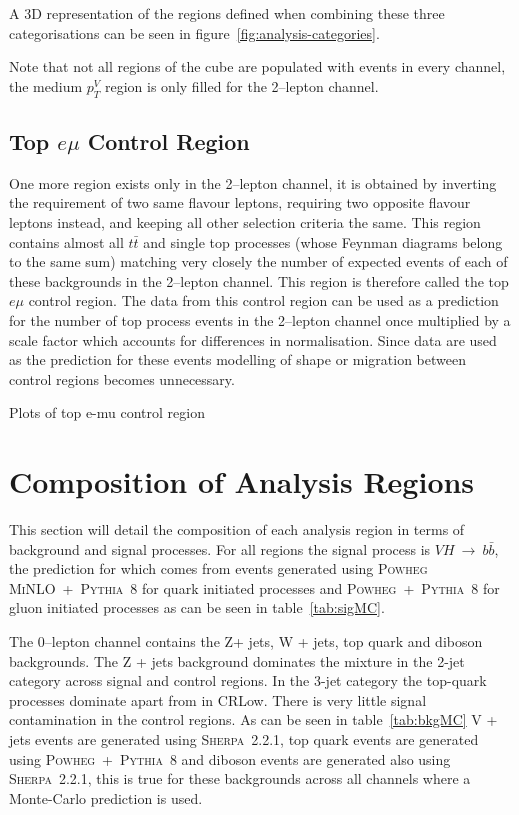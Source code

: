 A 3D representation of the regions defined when combining these three
categorisations can be seen in figure~\ref{fig:analysis-categories}.

Note that not all regions of the cube are populated with events in every channel, the medium
$p_T^V$ region is only filled for the 2--lepton channel.

\subsection{Top \texorpdfstring{$e \mu$}{e mu} Control Region}%
\label{sec:topemucr}

One more region exists only in the 2--lepton channel, it is obtained by
inverting the requirement of two same flavour leptons, requiring two opposite
flavour leptons instead, and keeping all other selection criteria the same. This
region contains almost all $t\bar{t}$ and single top processes (whose Feynman
diagrams belong to the same sum) matching very closely the number of expected
events of each of these backgrounds in the 2--lepton channel. This region is
therefore called the top $e \mu$ control region. The data from this control
region can be used as a prediction for the number of top process events in the
2--lepton channel once multiplied by a scale factor which accounts for
differences in normalisation. Since data are used as the prediction for these
events modelling of shape or migration between control regions becomes
unnecessary.

Plots of top e-mu control region

\section{Composition of Analysis Regions}
\label{sec:composition}

This section will detail the composition of each analysis region in terms of
background and signal processes. For all regions the signal process is
$VH~\rightarrow~b\bar{b}$, the prediction for which comes from events generated
using \textsc{Powheg MiNLO}~+~\textsc{Pythia~8} for quark initiated processes
and \textsc{Powheg}~+~\textsc{Pythia~8} for gluon initiated processes as can be
seen in table~\ref{tab:sigMC}.


The 0--lepton channel contains the  Z+ jets, W + jets, top quark and diboson
backgrounds. The Z + jets background dominates the mixture in the 2-jet category
across signal and control regions. In the 3-jet category the top-quark processes
dominate apart from in CRLow. There is very little signal contamination in the
control regions. As can be seen in table~\ref{tab:bkgMC} V + jets events are
generated using \textsc{Sherpa~2.2.1}, top quark events are generated using
\textsc{Powheg}~+~\textsc{Pythia~8} and diboson events are generated also using
\textsc{Sherpa~2.2.1}, this is true for these backgrounds across all channels
where a Monte-Carlo prediction is used.


